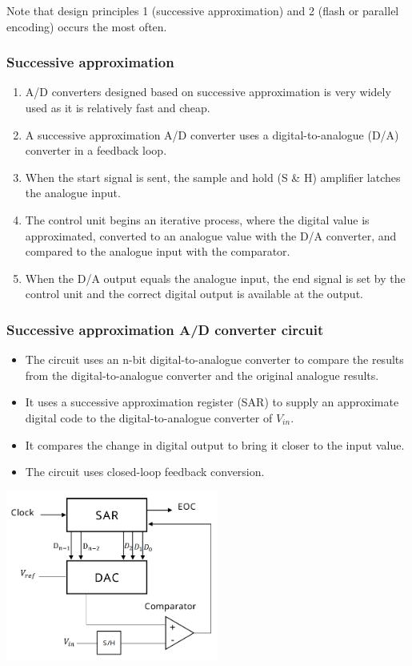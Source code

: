 \documentclass[11pt]{article}
\begin{document}
Note that design principles 1 (successive approximation) and 2 (flash or parallel encoding) occurs the most often.
\subsubsection{Successive approximation}
\label{sec:org62fe382}
\begin{enumerate}
\item A/D converters designed based on successive approximation is very widely used as it is relatively fast and cheap.
\item A successive approximation A/D converter uses a digital-to-analogue (D/A) converter in a feedback loop.
\item When the start signal is sent, the sample and hold (S \& H) amplifier latches the analogue input.
\item The control unit begins an iterative process, where the digital value is approximated, converted to an analogue value with the D/A converter, and compared to the analogue input with the comparator.
\item When the D/A output equals the analogue input, the end signal is set by the control unit and the correct digital output is available at the output.
\end{enumerate}
\subsubsection{Successive approximation A/D converter circuit}
\label{sec:org00a35b4}
\begin{itemize}
\item The circuit uses an n-bit digital-to-analogue converter to compare the results from the digital-to-analogue converter and the original analogue results.
\item It uses a successive approximation register (SAR) to supply an approximate digital code to the digital-to-analogue converter of \(V_{in}\).
\item It compares the change in digital output to bring it closer to the input value.
\item The circuit uses closed-loop feedback conversion.
\end{itemize}

\begin{center}
\includegraphics[height=15em]{./images/successive-approximation-adc-circuit.png}
\end{center}
\end{document}
